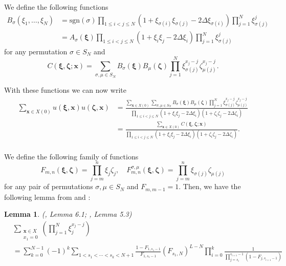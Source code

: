 \documentclass[a4paper,11pt]{article}
\newtheorem{lemma}[theorem]{Lemma}
\theoremstyle{definition}
\begin{document}
We define the following functions
\begin{equation}
    \begin{split}
    B_{\sigma} (\xi_1, \dots, \xi_N) &= \mathrm{sgn}(\sigma) \prod_{1 \leq i <j \leq N}\left(1 + \xi_{\sigma(i)}\xi_{\sigma(j)} - 2 \Delta \xi_{\sigma(i)}\right) \prod_{j=1}^N\xi_{\sigma(j)}^j \\
    &= A_\sigma(\boldsymbol{\xi})\prod_{1\leq i<j\leq N}\left( 1+\xi_i\xi_j-2\Delta\xi_i \right) \prod_{j=1}^N\xi_{\sigma(j)}^j
    \end{split}
\end{equation}
for any permutation $\sigma \in S_N$ and 
\begin{equation}
    C(\boldsymbol{\xi}, \boldsymbol{\zeta}; \mathbf{x}) = \sum_{\sigma, \mu \in S_N} B_{\sigma}(\boldsymbol{\xi}) B_{\mu}(\boldsymbol{\zeta}) \prod_{j=1}^N \xi_{\sigma(j)}^{x_j-j}\zeta_{\mu(j)}^{x_j -j}.
\end{equation}

With these functions we can now write
\begin{equation}\label{e:oneptsimplificationstep1}
\begin{split}
    \sum_{\mathbf{x} \in X(0)}u(\boldsymbol{\xi}, \mathbf{x})u(\boldsymbol{\zeta}, \mathbf{x}) &= \frac{\sum_{\mathbf{x} \in X(0)}\sum_{\sigma ,\mu \in S_N} B_{\sigma}(\boldsymbol{\xi}) B_{\mu}(\boldsymbol{\zeta}) \prod_{j=1}^N \xi_{\sigma(j)}^{x_j-j}\zeta_{\mu(j)}^{x_j-j}}{\prod_{1 \leq i <j \leq N}(1 + \xi_i \xi_j - 2 \Delta \xi_i)(1 + \zeta_i \zeta_j - 2 \Delta \zeta_i)}\\
    &=\frac{\sum_{\mathbf{x} \in X(0)}C(\boldsymbol{\xi}, \boldsymbol{\zeta}; \mathbf{x})}{\prod_{1 \leq i <j \leq N}(1 + \xi_i \xi_j - 2 \Delta \xi_i)(1 + \zeta_i \zeta_j - 2 \Delta \zeta_i)}.\\
\end{split}
\end{equation}


We define the following family of functions \begin{equation}
    F_{m,n}(\boldsymbol{\xi}, \boldsymbol{\zeta}) = \prod_{j=m}^n \xi_j \zeta_j, \quad F_{m,n}^{\sigma, \mu}(\boldsymbol{\xi},\boldsymbol{\zeta}) = \prod_{j=m}^n \xi_{\sigma(j)} \zeta_{\mu(j)}
\end{equation}
for any pair of permutations $\sigma, \mu \in S_N$ and $F_{m, m-1} =1$. Then, we have the following lemma from \cite{liu_integral_2020} and \cite{Baik2019-nd}:

\begin{lemma}(\cite{liu_integral_2020}, Lemma 6.1; \cite{Baik2019-nd}, Lemma 5.3)
    \begin{equation}
    \begin{split}
    &\sum_{\substack{\mathbf{x} \in X\\x_1=0}} \left( \prod_{j=1}^N \xi_{j}^{x_j-j}\right)\\
    &=\sum_{k=0}^{N-1}(-1)^k \sum_{1 < s_1 < \cdots < s_k < N+1} \frac{1 - F_{1, s_1-1}}{F_{1, s_1-1}}(F_{s_1, N})^{L-N} \prod_{i=0}^{k} \frac{1}{\prod_{j=s_i}^{s_{i+1}-1}(1 - F_{j, s_{i+1}-1}) }
    \end{split}
    \end{equation}
\end{lemma}
\end{document}
